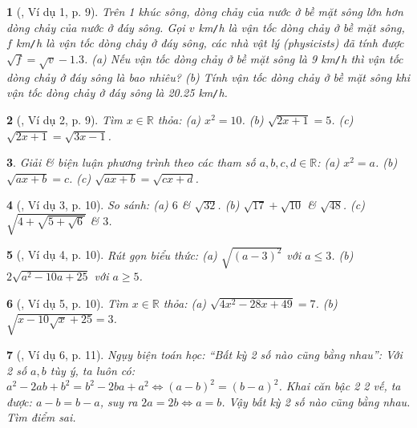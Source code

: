 \documentclass{article}
\newtheorem{baitoan}{}%
\begin{document}
\begin{baitoan}[\cite{Binh_boi_duong_Toan_9_tap_1}, Ví dụ 1, p. 9]
	Trên 1 khúc sông, dòng chảy của nước ở bề mặt sông lớn hơn dòng chảy của nước ở đáy sông. Gọi $v$ {\rm km{\tt/}h} là vận tốc dòng chảy ở bề mặt sông, $f$ {\rm km{\tt/}h} là vận tốc dòng chảy ở đáy sông, các nhà vật lý (physicists) đã tính được $\sqrt{f} = \sqrt{v} - 1.3$. (a) Nếu vận tốc dòng chảy ở bề mặt sông là {\rm9 km{\tt/}h} thì vận tốc dòng chảy ở đáy sông là bao nhiêu? (b) Tính vận tốc dòng chảy ở bề mặt sông khi vận tốc dòng chảy ở đáy sông là {\rm20.25 km{\tt/}h}.
\end{baitoan}

\begin{baitoan}[\cite{Binh_boi_duong_Toan_9_tap_1}, Ví dụ 2, p. 9]
	Tìm $x\in\mathbb{R}$ thỏa: (a) $x^2 = 10$. (b) $\sqrt{2x + 1} = 5$. (c) $\sqrt{2x + 1} = \sqrt{3x - 1}$.
\end{baitoan}

\begin{baitoan}
	Giải \& biện luận phương trình theo các tham số $a,b,c,d\in\mathbb{R}$: (a) $x^2 = a$. (b) $\sqrt{ax + b} = c$. (c) $\sqrt{ax + b} = \sqrt{cx + d}$.
\end{baitoan}

\begin{baitoan}[\cite{Binh_boi_duong_Toan_9_tap_1}, Ví dụ 3, p. 10]
	So sánh: (a) $6$ \& $\sqrt{32}$. (b) $\sqrt{17} + \sqrt{10}$ \& $\sqrt{48}$. (c) $\sqrt{4 + \sqrt{5 + \sqrt{6}}}$ \& $3$.
\end{baitoan}

\begin{baitoan}[\cite{Binh_boi_duong_Toan_9_tap_1}, Ví dụ 4, p. 10]
	Rút gọn biểu thức: (a) $\sqrt{(a - 3)^2}$ với $a\le3$. (b) $2\sqrt{a^2 - 10a + 25}$ với $a\ge5$.
\end{baitoan}

\begin{baitoan}[\cite{Binh_boi_duong_Toan_9_tap_1}, Ví dụ 5, p. 10]
	Tìm $x\in\mathbb{R}$ thỏa: (a) $\sqrt{4x^2 - 28x + 49} = 7$. (b) $\sqrt{x - 10\sqrt{x} + 25} = 3$.
\end{baitoan}

\begin{baitoan}[\cite{Binh_boi_duong_Toan_9_tap_1}, Ví dụ 6, p. 11]
	Ngụy biện toán học: ``Bất kỳ 2 số nào cũng bằng nhau'': Với 2 số $a,b$ tùy ý, ta luôn có: $a^2 - 2ab + b^2 = b^2 - 2ba + a^2\Leftrightarrow(a - b)^2 = (b - a)^2$. Khai căn bậc 2 2 vế, ta được: $a - b = b - a$, suy ra $2a = 2b\Leftrightarrow a = b$. Vậy bất kỳ 2 số nào cũng bằng nhau. Tìm điểm sai.
\end{baitoan}
\end{document}
